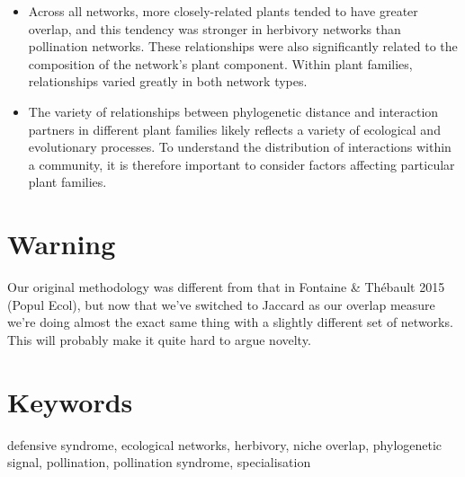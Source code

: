 \documentclass[12pt]{article}
\begin{document}
\begin{spacing}{1.0}
\begin{itemize}
    \item Across all networks, more closely-related plants tended to have 
          greater overlap, and this tendency was stronger in herbivory 
          networks than pollination networks. These relationships were also significantly related 
          to the composition of the network's plant component. Within plant families, 
          relationships varied greatly in both network types. 

    \item The variety of relationships between phylogenetic distance and
          interaction partners in different plant families likely
          reflects a variety of ecological and evolutionary processes. To 
          understand the distribution of interactions within a community, 
          it is therefore important to consider factors affecting particular 
          plant families.

  \end{itemize}

\section*{Warning}

Our original methodology was different from that in Fontaine \& Th\'{e}bault 2015 (Popul Ecol), but now that we've switched to Jaccard as our overlap measure we're doing almost the exact same thing with a slightly different set of networks. This will probably make it quite hard to argue novelty.


\section*{Keywords}

defensive syndrome, ecological networks, herbivory, niche overlap, phylogenetic signal, pollination, pollination syndrome, specialisation

\end{spacing}
\end{document}
